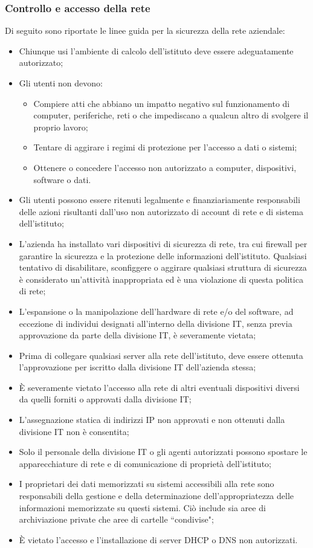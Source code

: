 \documentclass[12pt, a4paper, titlepage]{report}
\begin{document}
		\subsubsection{Controllo e accesso della rete}
		Di seguito sono riportate le linee guida per la sicurezza della rete aziendale:
		\begin{itemize}
			\item Chiunque usi l'ambiente di calcolo dell'istituto deve essere adeguatamente autorizzato;
			\item Gli utenti non devono:
			\begin{itemize}
				\item Compiere atti che abbiano un impatto negativo sul funzionamento di computer, periferiche, reti o che impediscano a qualcun altro di svolgere il proprio lavoro; 
				\item Tentare di aggirare i regimi di protezione per l'accesso a dati o sistemi; 
				\item Ottenere o concedere l'accesso non autorizzato a computer, dispositivi, software o dati. 
			\end{itemize}
			\item Gli utenti possono essere ritenuti legalmente e finanziariamente responsabili delle azioni risultanti dall'uso non autorizzato di account di rete e di sistema dell'istituto;
			\item L'azienda ha installato vari dispositivi di sicurezza di rete, tra cui firewall per garantire la sicurezza e la protezione delle informazioni dell'istituto. Qualsiasi tentativo di disabilitare, sconfiggere o aggirare qualsiasi struttura di sicurezza è considerato un'attività inappropriata ed è una violazione di questa politica di rete;
			\item L'espansione o la manipolazione dell'hardware di rete e/o del software, ad eccezione di individui designati all'interno della divisione IT, senza previa approvazione da parte della divisione IT, è severamente vietata;
			\item Prima di collegare qualsiasi server alla rete dell'istituto, deve essere ottenuta l'approvazione per iscritto dalla divisione IT dell'azienda stessa;
			\item È severamente vietato l'accesso alla rete di altri eventuali dispositivi diversi da quelli forniti o approvati dalla divisione IT;
			\item L'assegnazione statica di indirizzi IP non approvati e non ottenuti dalla divisione IT non è consentita;
			\item Solo il personale della divisione IT o gli agenti autorizzati possono spostare le apparecchiature di rete e di comunicazione di proprietà dell'istituto;
			\item I proprietari dei dati memorizzati su sistemi accessibili alla rete sono responsabili della gestione e della determinazione dell'appropriatezza delle informazioni memorizzate su questi sistemi. Ciò include sia aree di archiviazione private che aree di cartelle ``condivise";
			\item È vietato l'accesso e l'installazione di server DHCP o DNS non autorizzati.
		\end{itemize}
		
\end{document}
